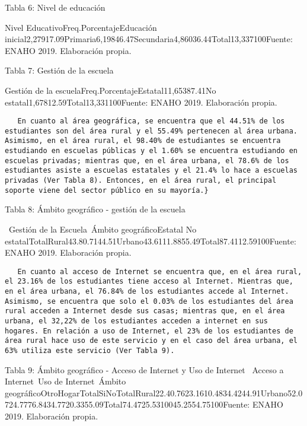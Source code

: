 Tabla 6: Nivel de educación

Nivel EducativoFreq.PorcentajeEducación
inicial2,27917.09Primaria6,19846.47Secundaria4,86036.44Total13,337100Fuente:
ENAHO 2019. Elaboración propia.

Tabla 7: Gestión de la escuela

Gestión de la escuelaFreq.PorcentajeEstatal11,65387.41No
estatal1,67812.59Total13,331100Fuente: ENAHO 2019. Elaboración propia.

\begin{verbatim}
   En cuanto al área geográfica, se encuentra que el 44.51% de los estudiantes son del área rural y el 55.49% pertenecen al área urbana. Asimismo, en el área rural, el 98.40% de estudiantes se encuentra estudiando en escuelas públicas y el 1.60% se encuentra estudiando en escuelas privadas; mientras que, en el área urbana, el 78.6% de los estudiantes asiste a escuelas estatales y el 21.4% lo hace a escuelas privadas (Ver Tabla 8). Entonces, en el área rural, el principal soporte viene del sector público en su mayoría.}
\end{verbatim}

Tabla 8: Ámbito geográfico - gestión de la escuela

~Gestión de la Escuela~Ámbito geográficoEstatal No
estatalTotalRural43.80.7144.51Urbano43.6111.8855.49Total87.4112.59100Fuente:
ENAHO 2019. Elaboración propia.

\begin{verbatim}
   En cuanto al acceso de Internet se encuentra que, en el área rural, el 23.16% de los estudiantes tiene acceso al Internet. Mientras que, en el área urbana, el 76.84% de los estudiantes accede al Internet.  Asimismo, se encuentra que solo el 0.03% de los estudiantes del área rural acceden a Internet desde sus casas; mientras que, en el área urbana, el 32,22% de los estudiantes acceden a internet en sus hogares. En relación a uso de Internet, el 23% de los estudiantes de área rural hace uso de este servicio y en el caso del área urbana, el 63% utiliza este servicio (Ver Tabla 9).
\end{verbatim}

Tabla 9: Ámbito geográfico - Acceso de Internet y Uso de Internet
~Acceso a Internet~Uso de Internet~Ámbito
geográficoOtroHogarTotalSiNoTotalRural22.40.7623.1610.4834.4244.91Urbano52.0724.7776.8434.7720.3355.09Total74.4725.5310045.2554.75100Fuente:
ENAHO 2019. Elaboración propia.

